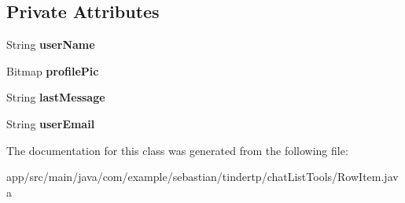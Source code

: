 \subsection*{Private Attributes}
\begin{DoxyCompactItemize}
\item 
String {\bfseries user\+Name}\hypertarget{classcom_1_1example_1_1sebastian_1_1tindertp_1_1chatListTools_1_1RowItem_a009ce223e2fab0a2cd6539ac23cca9a9}{}\label{classcom_1_1example_1_1sebastian_1_1tindertp_1_1chatListTools_1_1RowItem_a009ce223e2fab0a2cd6539ac23cca9a9}

\item 
Bitmap {\bfseries profile\+Pic}\hypertarget{classcom_1_1example_1_1sebastian_1_1tindertp_1_1chatListTools_1_1RowItem_ab55db85c5de43f1a9b520a33f5cfe671}{}\label{classcom_1_1example_1_1sebastian_1_1tindertp_1_1chatListTools_1_1RowItem_ab55db85c5de43f1a9b520a33f5cfe671}

\item 
String {\bfseries last\+Message}\hypertarget{classcom_1_1example_1_1sebastian_1_1tindertp_1_1chatListTools_1_1RowItem_a99a751e104dfd7618ee9e0e5d910ba63}{}\label{classcom_1_1example_1_1sebastian_1_1tindertp_1_1chatListTools_1_1RowItem_a99a751e104dfd7618ee9e0e5d910ba63}

\item 
String {\bfseries user\+Email}\hypertarget{classcom_1_1example_1_1sebastian_1_1tindertp_1_1chatListTools_1_1RowItem_ae0db2f3fafd87f5e09923b4845c2c930}{}\label{classcom_1_1example_1_1sebastian_1_1tindertp_1_1chatListTools_1_1RowItem_ae0db2f3fafd87f5e09923b4845c2c930}

\end{DoxyCompactItemize}


The documentation for this class was generated from the following file\+:\begin{DoxyCompactItemize}
\item 
app/src/main/java/com/example/sebastian/tindertp/chat\+List\+Tools/Row\+Item.\+java\end{DoxyCompactItemize}
